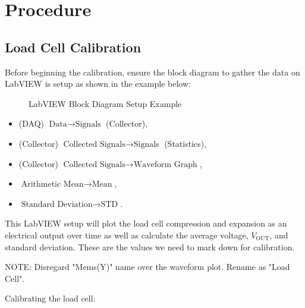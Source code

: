 \documentclass{article}
\begin{document}
\section{Procedure}
\subsection{Load Cell Calibration}
Before beginning the calibration, ensure the block diagram to gather the data on LabVIEW is setup as shown in the example below:
\begin{figure}[H]
    \centering
    \caption{LabVIEW Block Diagram Setup Example}
    \label{fig:labview1}
\end{figure}

\begin{itemize}
    \item (DAQ) $\text{Data}\rightarrow \text{Signals}$ (Collector),
    \item (Collector) $\text{Collected Signals}\rightarrow \text{Signals}$ (Statistics),
    \item (Collector) $\text{Collected Signals}\rightarrow \text{Waveform Graph}$,
    \item  $\text{Arithmetic Mean}\rightarrow \text{Mean}$,
    \item  $\text{Standard Deviation}\rightarrow \text{STD}$.
\end{itemize}

This LabVIEW setup will plot the load cell compression and expansion as an electrical output over time as well as calculate the average voltage, $V_{\text{OUT}}$, and standard deviation. These are the values we need to mark down for calibration.
\vspace{1mm}

NOTE: Disregard "Mems(Y)" name over the waveform plot. Rename as "Load Cell".
\vspace{5mm}

Calibrating the load cell:
\end{document}
